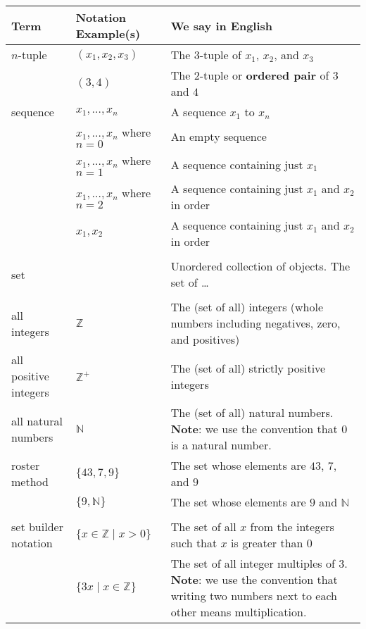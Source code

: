 \documentclass[12pt, oneside]{article}
\begin{document}
\begin{center}
\begin{tabular}{|llp{9cm}|}
\hline
Term & Notation Example(s) & We say in English \\
\hline
$n$-tuple & $(x_1, x_2, x_3)$ & The 3-tuple of $x_1$, $x_2$, and $x_3$ \\
          & $(3, 4)$ & The 2-tuple or {\bf ordered pair} of $3$ and $4$ \\

sequence & $x_1, \ldots, x_n$ & A sequence $x_1$ to $x_n$ \\
         & $x_1, \ldots, x_n$ where $n = 0$ & An empty sequence \\
         & $x_1, \ldots, x_n$ where $n = 1$ & A sequence containing just $x_1$ \\
         & $x_1, \ldots, x_n$ where $n = 2$ & A sequence containing just $x_1$ and $x_2$ in order \\
         & $x_1, x_2$ & A sequence containing just $x_1$ and $x_2$ in order \\
&&\\
set & & Unordered collection of objects. The set of \ldots \\
&&\\
all integers & $\mathbb{Z}$ & The (set of all) integers (whole numbers including negatives, zero, and positives) \\
all positive integers & $\mathbb{Z}^+$ & The (set of all) strictly positive integers \\
all natural numbers & $\mathbb{N}$ & The (set of all) natural numbers. {\bf Note}: we use the convention that $0$ is a natural number. \\
roster method & $\{43, 7, 9\}$ & The set whose elements are $43$, $7$, and $9$\\
              & $\{9, \mathbb{N}\}$ & The set whose elements are $9$ and $\mathbb{N}$\\

&&\\

set builder notation & $\{ x \in \mathbb{Z} \mid x > 0\}$ & The set of all $x$ from the integers such that $x$ is greater than $0$ \\
                     & $\{ 3x  \mid x \in \mathbb{Z} \}$ & The set of all integer multiples of $3$. {\bf Note}: we use the convention that writing two numbers next to each other means multiplication. \\


\end{tabular}
\end{center}
\end{document}

